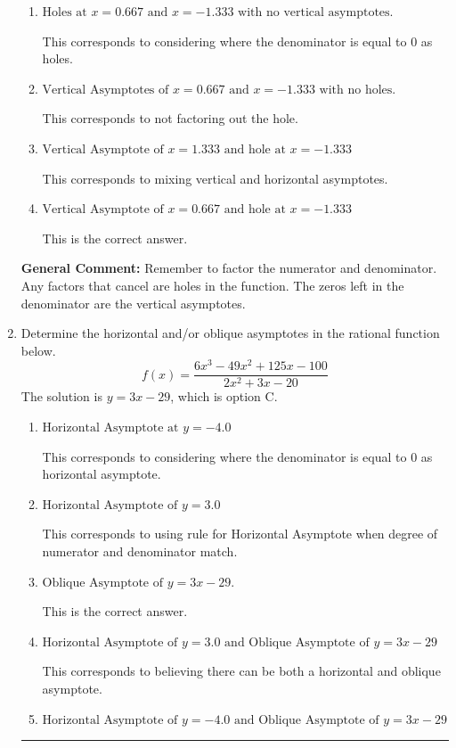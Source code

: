 \documentclass{extbook}[14pt]
\newcommand{\litem}[1]{\item #1

\rule{\textwidth}{0.4pt}}
\begin{document}
\begin{enumerate}
{\begin{enumerate}[label=\Alph*.]
This corresponds to setting the numerator equal to 0.
\item \( \text{Holes at } x = 0.667 \text{ and } x = -1.333 \text{ with no vertical asymptotes.} \)

This corresponds to considering where the denominator is equal to 0 as holes.
\item \( \text{Vertical Asymptotes of } x = 0.667 \text{ and } x = -1.333 \text{ with no holes.} \)

This corresponds to not factoring out the hole.
\item \( \text{Vertical Asymptote of } x = 1.333 \text{ and hole at } x = -1.333 \)

This corresponds to mixing vertical and horizontal asymptotes.
\item \( \text{Vertical Asymptote of } x = 0.667 \text{ and hole at } x = -1.333 \)

This is the correct answer.
\end{enumerate}

\textbf{General Comment:} Remember to factor the numerator and denominator. Any factors that cancel are holes in the function. The zeros left in the denominator are the vertical asymptotes.
}
\litem{
Determine the horizontal and/or oblique asymptotes in the rational function below.
\[ f(x) = \frac{6x^{3} -49 x^{2} +125 x -100}{2x^{2} +3 x -20} \]The solution is \( y = 3x -29 \), which is option C.\begin{enumerate}[label=\Alph*.]
\item \( \text{Horizontal Asymptote at } y = -4.0 \)

This corresponds to considering where the denominator is equal to 0 as horizontal asymptote.
\item \( \text{Horizontal Asymptote of } y = 3.0  \)

This corresponds to using rule for Horizontal Asymptote when degree of numerator and denominator match.
\item \( \text{Oblique Asymptote of } y = 3x -29. \)

This is the correct answer.
\item \( \text{Horizontal Asymptote of } y = 3.0 \text{ and Oblique Asymptote of } y = 3x -29 \)

This corresponds to believing there can be both a horizontal and oblique asymptote.
\item \( \text{Horizontal Asymptote of } y = -4.0 \text{ and Oblique Asymptote of } y = 3x -29 \)


\end{enumerate}}
\end{enumerate}
\end{document}
